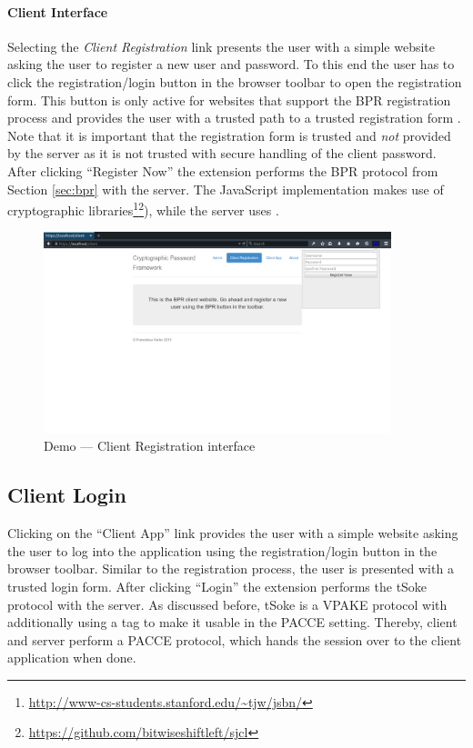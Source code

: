\paragraph{Client Interface}
Selecting the \emph{Client Registration} link presents the user with a simple website asking the user to register a new user and password.
To this end the user has to click the registration/login button in the browser toolbar to open the registration form.
This button is only active for websites that support the \ac{BPR} registration process and provides the user with a trusted path to a trusted registration form \cite{}.
Note that it is important that the registration form is trusted and \emph{not} provided by the server as it is not trusted with secure handling of the client password.
After clicking ``Register Now'' the extension performs the \ac{BPR} protocol from Section \ref{sec:bpr} with the server.
The JavaScript implementation makes use of cryptographic libraries\footnote{\url{http://www-cs-students.stanford.edu/~tjw/jsbn/}}\footnote{\url{https://github.com/bitwiseshiftleft/sjcl}}), while the server uses \cite{charm13}.

\begin{figure}[tbph]
\centering
\includegraphics[width=0.9\textwidth]{Figs/demo-register-popup.png}
\caption{Demo --- Client Registration interface}\label{fig:demo-register}
\end{figure}

\subsection{Client Login}
Clicking on the ``Client App'' link provides the user with a simple website asking the user to log into the application using the registration/login button in the browser toolbar.
Similar to the registration process, the user is presented with a trusted login form.
After clicking ``Login'' the extension performs the tSoke protocol with the server.
As discussed before, tSoke is a \ac{VPAKE} protocol with additionally using a tag to make it usable in the \ac{PACCE} setting.
Thereby, client and server perform a \ac{PACCE} protocol, which hands the session over to the client application when done.

